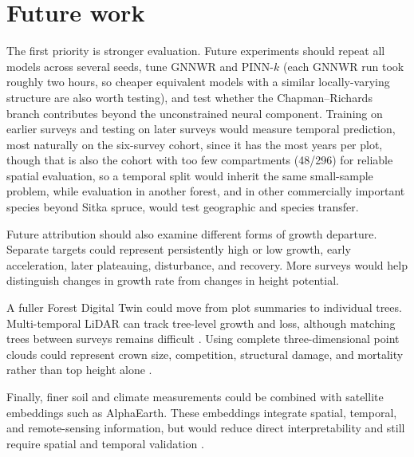 \documentclass[logo,msc,ai]{infthesis}           %
\begin{document}
\section{Future work}

The first priority is stronger evaluation. Future experiments should repeat all models across several seeds, tune GNNWR and PINN-$k$ (each GNNWR run took roughly two hours, so cheaper equivalent models with a similar locally-varying structure are also worth testing), and test whether the Chapman--Richards branch contributes beyond the unconstrained neural component. Training on earlier surveys and testing on later surveys would measure temporal prediction, most naturally on the six-survey cohort, since it has the most years per plot, though that is also the cohort with too few compartments (48/296) for reliable spatial evaluation, so a temporal split would inherit the same small-sample problem, while evaluation in another forest, and in other commercially important species beyond Sitka spruce, would test geographic and species transfer.

Future attribution should also examine different forms of growth departure. Separate targets could represent persistently high or low growth, early acceleration, later plateauing, disturbance, and recovery. More surveys would help distinguish changes in growth rate from changes in height potential.

A fuller Forest Digital Twin could move from plot summaries to individual trees. Multi-temporal LiDAR can track tree-level growth and loss, although matching trees between surveys remains difficult \cite{duncanson2018Utility_FW}. Using complete three-dimensional point clouds could represent crown size, competition, structural damage, and mortality rather than top height alone \cite{weiser2022Individual_FW}.

Finally, finer soil and climate measurements could be combined with satellite embeddings such as AlphaEarth. These embeddings integrate spatial, temporal, and remote-sensing information, but would reduce direct interpretability and still require spatial and temporal validation \cite{brown2025AlphaEarth_C4_NN}.





\end{document}
